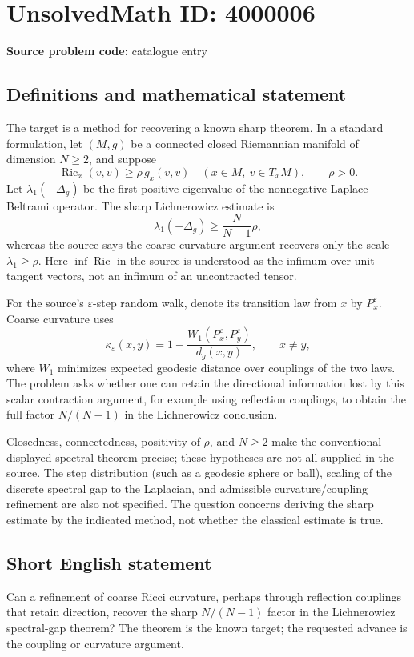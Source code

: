 \documentclass[11pt]{article}
\begin{document}
\section*{UnsolvedMath ID: 4000006}
\textbf{Source problem code:} catalogue entry
\subsection{Definitions and mathematical statement}
The target is a method for recovering a known sharp theorem. In a standard formulation, let $(M,g)$ be a connected closed Riemannian manifold of dimension $N\geq2$, and suppose
\[
\operatorname{Ric}_x(v,v)\geq\rho\,g_x(v,v)\quad(x\in M,\ v\in T_xM),\qquad \rho>0.
\]
Let $\lambda_1(-\Delta_g)$ be the first positive eigenvalue of the nonnegative Laplace--Beltrami operator. The sharp Lichnerowicz estimate is
\[
\lambda_1(-\Delta_g)\geq\frac{N}{N-1}\rho,
\]
whereas the source says the coarse-curvature argument recovers only the scale $\lambda_1\geq\rho$. Here $\inf\operatorname{Ric}$ in the source is understood as the infimum over unit tangent vectors, not an infimum of an uncontracted tensor.

For the source's $\varepsilon$-step random walk, denote its transition law from $x$ by $P_x^\varepsilon$. Coarse curvature uses
\[
\kappa_\varepsilon(x,y)=1-\frac{W_1(P_x^\varepsilon,P_y^\varepsilon)}{d_g(x,y)},\qquad x\ne y,
\]
where $W_1$ minimizes expected geodesic distance over couplings of the two laws. The problem asks whether one can retain the directional information lost by this scalar contraction argument, for example using reflection couplings, to obtain the full factor $N/(N-1)$ in the Lichnerowicz conclusion.

Closedness, connectedness, positivity of $\rho$, and $N\geq2$ make the conventional displayed spectral theorem precise; these hypotheses are not all supplied in the source. The step distribution (such as a geodesic sphere or ball), scaling of the discrete spectral gap to the Laplacian, and admissible curvature/coupling refinement are also not specified. The question concerns deriving the sharp estimate by the indicated method, not whether the classical estimate is true.
\subsection{Short English statement}
Can a refinement of coarse Ricci curvature, perhaps through reflection couplings that retain direction, recover the sharp $N/(N-1)$ factor in the Lichnerowicz spectral-gap theorem? The theorem is the known target; the requested advance is the coupling or curvature argument.
\end{document}
